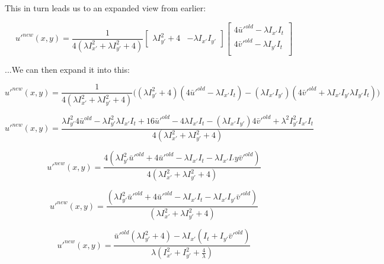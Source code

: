 \documentclass{article}
\begin{document}
\noindent This in turn leads us to an expanded view from earlier:

\begin{equation}
    u'^{new}(x,y) =
    \frac{1}{4(\lambda I_{x'}^2 + \lambda I_{y'}^2 + 4)}
    \begin{bmatrix}
        \lambda I_{y'}^2 + 4 & -\lambda I_{x'} I_{y'}
    \end{bmatrix}
    \begin{bmatrix}
        4\bar{u}'^{old}-\lambda I_{x'} I_t \\
        4\bar{v}'^{old}-\lambda I_{y'} I_t \\
    \end{bmatrix}
\end{equation}

\noindent ...We can then expand it into this:

\begin{equation}
    u'^{new}(x,y) = \frac{1}{4(\lambda I_{x'}^2 + \lambda I_{y'}^2 + 4)}
    \big(
    (\lambda I_{y'}^2 +4)(4\bar{u}'^{old}-\lambda I_{x'} I_t) - (\lambda I_{x'} I_{y'})(4\bar{v}'^{old}+\lambda I_{x'} I_{y'} \lambda I_{y'} I_t)
    )
\end{equation}

\begin{equation}
    u'^{new}(x,y) = \frac
    {\lambda I_{y'}^2 4\bar{u}^{old}-\lambda I_{y'}^2 \lambda I_{x'} I_t + 16\bar{u}'^{old}-4\lambda I_{x'} I_t-(\lambda I_{x'} I_{y'})4\bar{v}'^{old}+\lambda^2 I_{y'}^2 I_{x'} I_t}
    {4(\lambda I_{x'}^2 + \lambda I_{y'}^2 + 4)}
\end{equation}

\begin{equation}
    u'^{new}(x,y) = \frac
    {4(\lambda I_{y'}^2 \bar{u}'^{old} + 4\bar{u}'^{old} - \lambda I_{x'} I_t - \lambda I_{x'} I_{'}y \bar{v}'^{old})}
    {4(\lambda I_{x'}^2 + \lambda I_{y'}^2 + 4)}
\end{equation}

\begin{equation}
    u'^{new}(x,y) = \frac
    {(\lambda I_{y'}^2 \bar{u}'^{old} + 4\bar{u}'^{old} - \lambda I_{x'} I_t - \lambda I_{x'} I_{y'} \bar{v}'^{old})}
    {(\lambda I_{x'}^2 + \lambda I_{y'}^2 + 4)}
\end{equation}

\begin{equation}
    u'^{new}(x,y) = \frac
    {\bar{u}'^{old} (\lambda I_{y'}^2 + 4) - \lambda I_{x'} (I_t + I_{y'} \bar{v}'^{old})}
    {\lambda (I_{x'}^2 + I_{y'}^2 + \frac{4}{\lambda})}
\end{equation}
\end{document}
